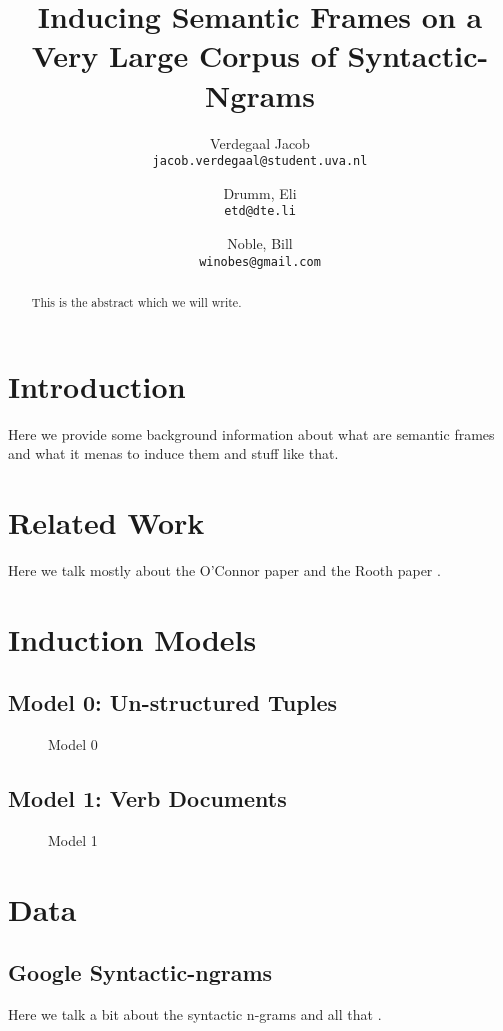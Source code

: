 \documentclass[11pt,twocolumn]{scrartcl}
\author{
    Verdegaal Jacob \\
    \texttt{jacob.verdegaal@student.uva.nl}
    \and
    Drumm, Eli\\
    \texttt{etd@dte.li}
    \and
    Noble, Bill\\
    \texttt{winobes@gmail.com}
}
\title{Inducing Semantic Frames on a Very Large Corpus of Syntactic-Ngrams}
\begin{document}
\maketitle

\begin{abstract}
This is the abstract which we will write.
\end{abstract}



\section{Introduction}
Here we provide some background information about what are semantic frames and 
what it menas to induce them and stuff like that.


\section{Related Work}
Here we talk mostly about the O'Connor paper \cite{oconnor2013} and the Rooth 
paper \cite{rooth1999}.


\section{Induction Models}

\subsection{Model 0: Un-structured Tuples}
\begin{figure}

\caption{Model 0}
\end{figure}

\subsection{Model 1: Verb Documents}
\begin{figure}
    
    \caption{Model 1}
\end{figure}


\section{Data}

\subsection{Google Syntactic-ngrams}
Here we talk a bit about the syntactic n-grams and all that \cite{ngrams2013}.
\end{document}
